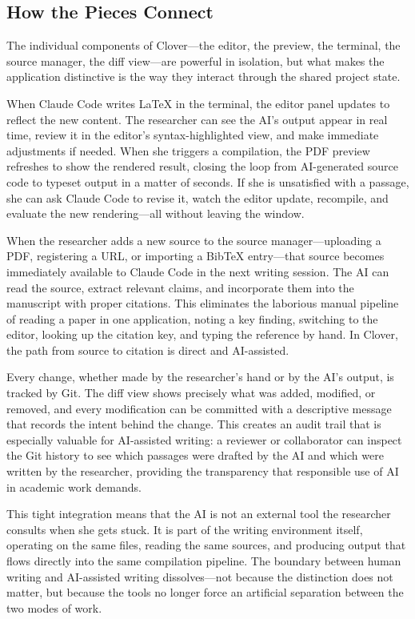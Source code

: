 \documentclass[a4paper,11pt]{article}
\begin{document}
\subsection{How the Pieces Connect}

The individual components of Clover---the editor, the preview, the terminal, the source manager, the diff view---are powerful in isolation, but what makes the application distinctive is the way they interact through the shared project state.

When Claude Code writes \LaTeX{} in the terminal, the editor panel updates to reflect the new content. The researcher can see the AI's output appear in real time, review it in the editor's syntax-highlighted view, and make immediate adjustments if needed. When she triggers a compilation, the PDF preview refreshes to show the rendered result, closing the loop from AI-generated source code to typeset output in a matter of seconds. If she is unsatisfied with a passage, she can ask Claude Code to revise it, watch the editor update, recompile, and evaluate the new rendering---all without leaving the window.

When the researcher adds a new source to the source manager---uploading a PDF, registering a URL, or importing a BibTeX entry---that source becomes immediately available to Claude Code in the next writing session. The AI can read the source, extract relevant claims, and incorporate them into the manuscript with proper citations. This eliminates the laborious manual pipeline of reading a paper in one application, noting a key finding, switching to the editor, looking up the citation key, and typing the reference by hand. In Clover, the path from source to citation is direct and AI-assisted.

Every change, whether made by the researcher's hand or by the AI's output, is tracked by Git. The diff view shows precisely what was added, modified, or removed, and every modification can be committed with a descriptive message that records the intent behind the change. This creates an audit trail that is especially valuable for AI-assisted writing: a reviewer or collaborator can inspect the Git history to see which passages were drafted by the AI and which were written by the researcher, providing the transparency that responsible use of AI in academic work demands.

This tight integration means that the AI is not an external tool the researcher consults when she gets stuck. It is part of the writing environment itself, operating on the same files, reading the same sources, and producing output that flows directly into the same compilation pipeline. The boundary between human writing and AI-assisted writing dissolves---not because the distinction does not matter, but because the tools no longer force an artificial separation between the two modes of work.
\end{document}
